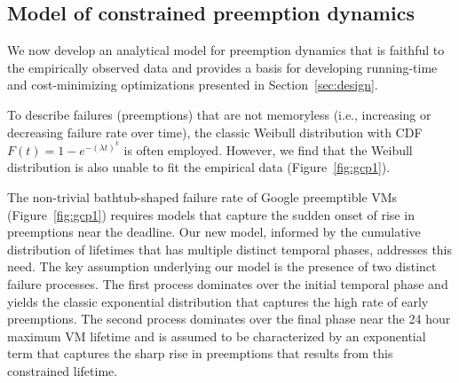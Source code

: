 \subsection{Model of constrained preemption dynamics}
\label{subsec:analytical-model}

We now develop an analytical model for preemption dynamics that is faithful to the empirically observed data and provides a basis for developing running-time and cost-minimizing optimizations presented in Section~\ref{sec:design}. 

To describe failures (preemptions) that are not memoryless (i.e., increasing or decreasing failure rate over time), the classic Weibull distribution with CDF $F(t)=1-e^{-(\lambda t)^k}$ is often employed. However, we find that the Weibull distribution is also unable to fit the empirical data (Figure~\ref{fig:gcp1}). 

The non-trivial bathtub-shaped failure rate of Google preemptible VMs (Figure~\ref{fig:gcp1}) requires models that capture the sudden onset of rise in preemptions near the deadline. 
Our new model, informed by the cumulative distribution of lifetimes that has multiple distinct temporal phases, addresses this need. The key assumption underlying our model is the presence of two distinct failure processes.
The first process dominates over the initial temporal phase and yields the classic exponential distribution that captures the high rate of early preemptions. The second process dominates over the final phase near the 24 hour maximum VM lifetime and is assumed to be characterized by an exponential term that captures the sharp rise in preemptions that results from this constrained lifetime. 

%
%

